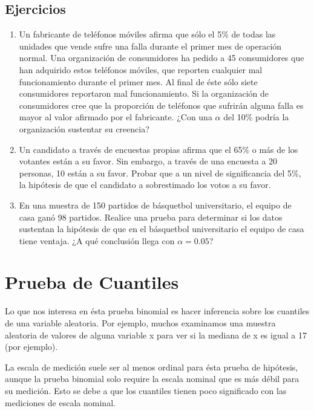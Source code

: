 \documentclass[
  a4paper,
  oneside,
  openany]{book}
\begin{document}
\hypertarget{ejercicios}{%
\section{Ejercicios}\label{ejercicios}}

\begin{enumerate}
\def\labelenumi{\arabic{enumi}.}
\item
  Un fabricante de teléfonos móviles afirma que sólo el 5\% de todas las unidades que vende sufre una falla durante el primer mes de operación normal. Una organización de consumidores ha pedido a 45 consumidores que han adquirido estos teléfonos móviles, que reporten cualquier mal funcionamiento durante el primer mes. Al final de éste sólo siete consumidores reportaron mal funcionamiento. Si la organización de consumidores cree que la proporción de teléfonos que sufrirán alguna falla es mayor al valor afirmado por el fabricante. ¿Con una \(\alpha\) del 10\% podría la organización sustentar su creencia?
\item
  Un candidato a través de encuestas propias afirma que el 65\% o más de los votantes están a su favor. Sin embargo, a través de una encuesta a 20 personas, 10 están a su favor. Probar que a un nivel de significancia del 5\%, la hipótesis de que el candidato a sobrestimado los votos a su favor.
\item
  En una muestra de 150 partidos de básquetbol universitario, el equipo de casa ganó 98 partidos. Realice una prueba para determinar si los datos sustentan la hipótesis de que en el básquetbol universitario el equipo de casa tiene ventaja. ¿A qué conclusión llega con \(\alpha= 0.05\)?
\end{enumerate}

\hypertarget{prueba-de-cuantiles}{%
\chapter{Prueba de Cuantiles}\label{prueba-de-cuantiles}}

Lo que nos interesa en ésta prueba binomial es hacer inferencia sobre los cuantiles de una variable aleatoria. Por ejemplo, muchos examinamos una muestra aleatoria de valores de alguna variable x para ver si la mediana de x es igual a 17 (por ejemplo).

La escala de medición suele ser al menos ordinal para ésta prueba de hipótesis, aunque la prueba binomial solo require la escala nominal que es más débil para su medición. Esto se debe a que los cuantiles tienen poco significado con las mediciones de escala nominal.
\end{document}
